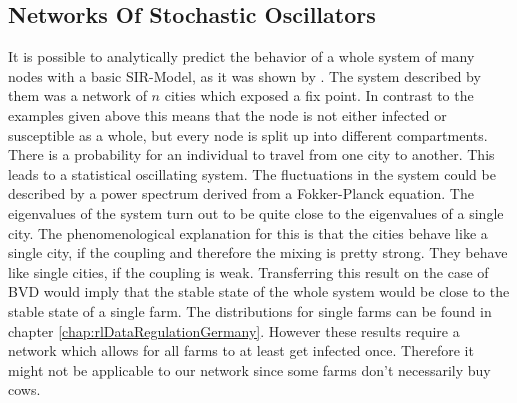 \subsection{Networks Of Stochastic Oscillators}
It is possible to analytically predict the behavior of a whole system of many nodes with a basic SIR-Model, as it was shown by \citep{ROZ11}. The system described by them was a network of $n$ cities which exposed a fix point. In contrast to the examples given above this means that the node is not either infected or susceptible as a whole, but every node is split up into different compartments. There is a probability for an individual to travel from one city to another. This leads to a statistical oscillating system. The fluctuations in the system could be described by a power spectrum derived from a Fokker-Planck equation. 
The eigenvalues of the system turn out to be quite close to the eigenvalues of a single city. The phenomenological explanation for this is that the cities behave like a single city, if the coupling and therefore the mixing is pretty strong. They behave like single cities, if the coupling is weak. 
Transferring this result on the case of BVD would imply that the stable state of the whole system would be close to the stable state of a single farm. The distributions for single farms can be found in chapter \ref{chap:rlDataRegulationGermany}. However these results require a network which allows for all farms to at least get infected once. Therefore it might not be applicable to our network since some farms don't necessarily buy cows.